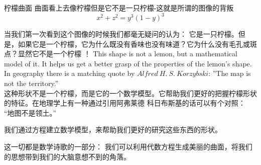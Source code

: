 ﻿\begin{surferPage}{柠檬曲面}
曲面看上去像柠檬但是它不是一只柠檬-这就是所谓的图像的背叛\\
\smallskip
\[x^2 + z^2 = y^3 (1 - y)^3\] 

\singlespacing
当我们第一次看到这个图像的时候我们都毫无疑问的认为： 它是一只柠檬。但是，如果它是一个柠檬，它为什么既没有香味也没有味道？它为什么没有毛孔或斑点？显然它不是一个柠檬 ！
\singlespacing
This shape is not a lemon, but a mathematical model of it. It helps us get a better grasp of the properties of the lemon's shape. In geography there is a matching quote by $Alfred\ H.\ S.\ Korzybski$: ''The map is not the territory.'' \\

这种形状不是一个柠檬，而是它的一个数学模型。它帮助我们更好的把握柠檬形状的特征。在地理学上有一种通过引用阿弗莱德 科日布斯基的话可以有个对照： “地图不是领土。”\\

\singlespacing

我们通过方程建立数学模型，来帮助我们更好的研究这些东西的形状。

\singlespacing

这一切都是数学诗歌的一部分： 我们可以利用代数方程生成美丽的曲面，将我们的思想带到我们的大脑意想不到的角落。

\end{surferPage}

